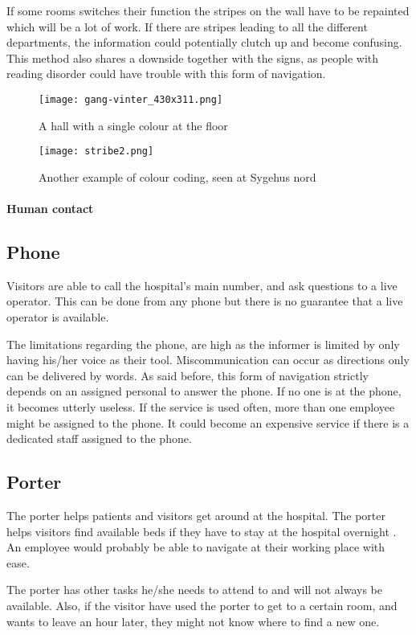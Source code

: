If some rooms switches their function the stripes on the wall have to be repainted which will be a lot of work. If there are stripes leading to all the different departments, the information could potentially clutch up and become confusing. This method also shares a downside together with the signs, as people with reading disorder could have trouble with this form of navigation.
  \begin{figure}[ht!]
  \centering
  \texttt{[image: gang-vinter\_430x311.png]}
  \caption{A hall with a single colour at the floor}
  \label{overflow}
  \end{figure}
    \begin{figure}[ht!]
    \centering
    \texttt{[image: stribe2.png]}
    \caption{Another example of colour coding, seen at Sygehus nord}
    \label{overflow}
    \end{figure}
\paragraph{Human contact}
\subsection{Phone}
Visitors are able to call the hospital's main number, and ask questions to a live operator. This can be done from any phone but there is no guarantee that a live operator is available.

The limitations regarding the phone, are high as the informer is limited by only having his/her voice as their tool. Miscommunication can occur as directions only can be delivered by words. As said before, this form of navigation strictly depends on an assigned personal to answer the phone. If no one is at the phone, it becomes utterly useless.
If the service is used often, more than one employee might be assigned to the phone. It could become an expensive service if there is a dedicated staff assigned to the phone. 

\subsection{Porter}
The porter helps patients\cite{porter} and visitors get around at the hospital. The porter helps visitors find available beds if they have to stay at the hospital overnight \cite{ugd_port}. An employee would probably be able to navigate at their working place with ease.

The porter has other tasks he/she needs to attend to and will not always be available. Also, if the visitor have used the porter to get to a certain room, and wants to leave an hour later, they might not know where to find a new one. 

